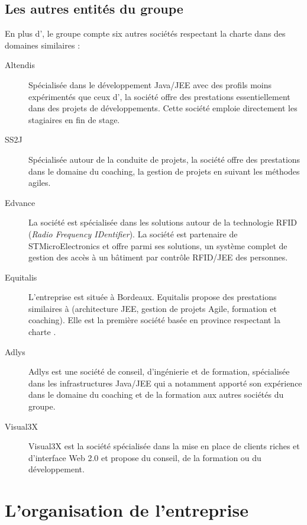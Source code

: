 \subsection{Les autres entités du groupe}

En plus d'\ebi{}, le groupe compte six autres sociétés respectant la charte \excilys{} dans des domaines similaires :

\begin{description}
	\item [Altendis] 
	Spécialisée dans le développement Java/JEE avec des profils moins expérimentés que ceux d'\ebi{}, la société offre des prestations essentiellement dans des projets de développements. Cette société emploie directement les stagiaires en fin de stage.
	
	\item [SS2J] 
	Spécialisée autour de la conduite de projets, la société offre des prestations dans le domaine du coaching, la gestion de projets en suivant les méthodes agiles.
	
	\item [Edvance] 
	La société est spécialisée dans les solutions autour de la technologie RFID (\textit{Radio Frequency IDentifier}). La société est partenaire de STMicroElectronics et offre parmi ses solutions, un système complet de gestion des accès à un bâtiment par contrôle RFID/JEE des personnes.
	
	\item [Equitalis]
	L'entreprise est située à Bordeaux. Equitalis propose des prestations similaires à \ebi{} (architecture JEE, gestion de projets Agile, formation et coaching). Elle est la première société basée en province respectant la charte \excilys{}.
	
	\item [Adlys]
	Adlys est une société de conseil, d'ingénierie et de formation, spécialisée dans les infrastructures Java/JEE qui a notamment apporté son expérience dans le domaine du coaching et de la formation aux autres sociétés du groupe.
	
	\item [Visual3X] 
	Visual3X est la société spécialisée dans la mise en place de clients riches et d'interface Web 2.0 et propose du conseil, de la formation ou du développement. 
\end{description}

\section{L'organisation de l'entreprise}


